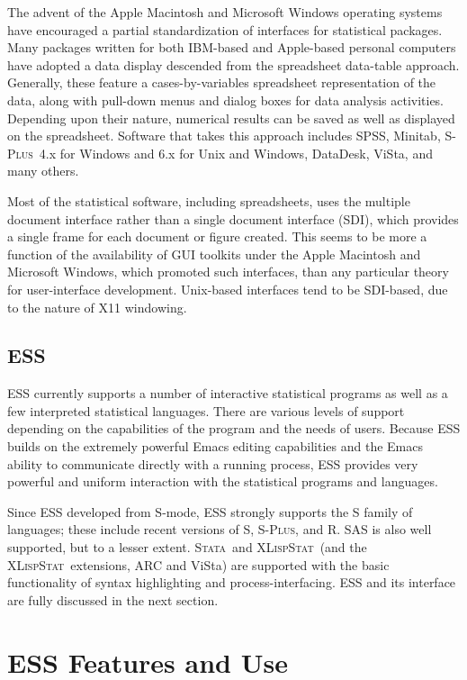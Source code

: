 \documentclass{article}
\newcommand*{\Splus}{\textsc{S-Plus}}
\newcommand*{\XLispStat}{\textsc{XLispStat}}
\newcommand*{\Stata}{\textsc{Stata}}
\begin{document}
The advent of the Apple Macintosh and Microsoft Windows operating
systems have encouraged a partial standardization of interfaces for
statistical packages.  Many packages written for both IBM-based and
Apple-based personal computers have adopted a data display descended
from the spreadsheet data-table approach.  Generally, these feature a
cases-by-variables spreadsheet representation of the data, along with
pull-down menus and dialog boxes for data analysis activities.
Depending upon their nature, numerical results can be saved as well as
displayed on the spreadsheet.  Software that takes this approach
includes SPSS, Minitab, \Splus\ 4.x for Windows and 6.x for Unix and
Windows, DataDesk, ViSta, and many others.

Most of the statistical software, including spreadsheets, uses the
multiple document interface rather than a single document interface
(SDI), which provides a single frame for each document or figure
created.  This seems to be more a function of the availability of GUI
toolkits under the Apple Macintosh and Microsoft Windows, which
promoted such interfaces, than any particular theory for
user-interface development.  Unix-based interfaces tend to be
SDI-based, due to the nature of X11 windowing.

\subsection{ESS}
\label{sec:UI:ESS}

ESS currently supports a number of interactive statistical programs as
well as a few interpreted statistical languages.  There are various
levels of support depending on the capabilities of the program and the
needs of users.  Because ESS builds on the extremely powerful Emacs
editing capabilities and the Emacs ability to communicate directly
with a running process, ESS provides very powerful and uniform
interaction with the statistical programs and languages.

Since ESS developed from S-mode, ESS strongly supports the S family of
languages; these include recent versions of S, \Splus, and R.  SAS is
also well supported, but to a lesser extent.  \Stata\ and \XLispStat\ 
(and the \XLispStat\ extensions, ARC and ViSta) are supported with the
basic functionality of syntax highlighting and process-interfacing.
ESS and its interface are fully discussed in the next section.

\section{ESS Features and Use}
\label{sec:basic}
\end{document}
